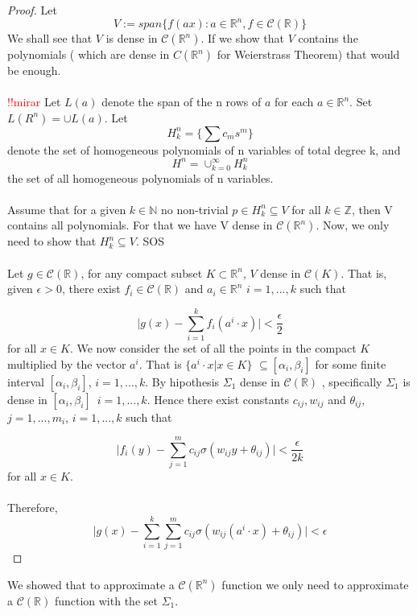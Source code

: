 \documentclass[../main.tex]{subfiles}
\begin{document}
	\begin{proof} %
			Let $$V:= span\{ f(ax) : a \in \mathbb{R}^n, f \in \mathcal{C}(\mathbb{R}) \}$$ We shall see that $V$ is dense in $\mathcal{C}(\mathbb{R}^n)$.  If we show that $V$ contains the polynomials ( which are dense in $C(\mathbb{R}^n)$ for Weierstrass Theorem) that would be enough. \\ \\  
			\textcolor{red}{!!mirar}
			Let $L(a)$ denote the span of the n rows of $a$ for each $a\in \mathbb{R}^n$. Set $L(R^n) = \cup L(a)$. Let $$H_k^n= \{ \sum c_m s^m \}$$  denote the set of homogeneous polynomials of n variables of total degree k, and $$H^n= \cup_{k=0}^\infty H_k^n$$ the set of all homogeneous polynomials of n variables. \\  \\ 
			Assume that for a given $k\in \mathbb{N}$ no non-trivial $p\in H_k^n \subseteq V$ for all $k\in \mathbb{Z}$, then V contains all polynomials. For that we have V dense in $\mathcal{C}(\mathbb{R}^n)$. Now, we only need to show that $H_k^n \subseteq  V$. SOS
			\\ \\
			Let $g\in \mathcal{C}(\mathbb{R}) $, for any compact subset $K \subset \mathbb{R}^n  $, $V$ dense in $\mathcal{C}(K)$. That is, given $\epsilon >0$, there exist $f_i\in  \mathcal{C}(\mathbb{R})$ and $a_i \in \mathbb{R}^n $    {\scriptsize $i=1,...,k$}  such that
			
			$$ \big| g(x)-\sum_{i=1}^k f_i(a^i \cdot x) \big| < \frac{\epsilon}{2}$$
			for all $x\in K$. We now consider the set of all the points in the compact $K$ multiplied by the vector $a^i$. That is $\{a^i \cdot x | x \in K\}$ $\subseteq[\alpha_i,\beta_i] $ for some finite interval $[\alpha_i,\beta_i]$, $i=1,...,k$. By hipothesis $\Sigma_1 $ dense in $\mathcal{C}(\mathbb{R})$ , specifically $\Sigma_1 $ is dense in $[\alpha_i,\beta_i ]$ $ \, i=1,...,k$. Hence there exist constants $c_{ij}, w_{ij}$ and $\theta_{ij}$, $j=1,...,m_i$, $i=1,...,k$ such that 
			
			$$ \big| f_i(y) - \sum_{j=1}^{m} c_{ij} \sigma(w_{ij}y+ \theta_{ij})\big| < \frac{\epsilon}{2k}$$
			for all $x\in K$. \\ \\
			Therefore, 
			$$ \big| g(x) - \sum_{i=1}^k \sum_{j=1}^m c_{ij} \sigma(w_{ij}(a^i \cdot x) + \theta_{ij})  \big| < \epsilon$$
		\end{proof}
	\noindent We showed that to approximate a $\mathcal{C}(\mathbb{R}^n)$ function we only need to approximate a $\mathcal{C} (\mathbb{R})$ function with the set $\Sigma_1$. 
\end{document}
